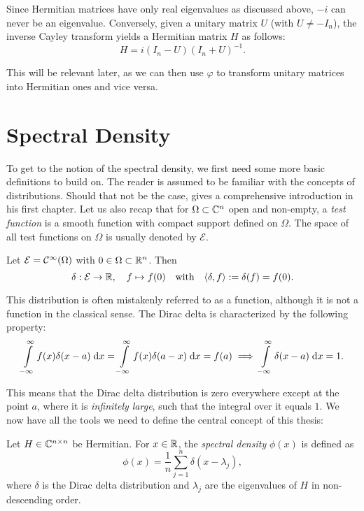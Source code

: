 Since Hermitian matrices have only real eigenvalues as discussed above, $-i$ can never be an eigenvalue. Conversely, given a unitary matrix $U$ (with $U \neq -I_n$), the inverse Cayley transform yields a Hermitian matrix $H$ as follows:
\[
H = i (I_n - U)(I_n + U)^{-1}.
\]

This will be relevant later, as we can then use $\varphi$ to transform unitary matrices into Hermitian ones and vice versa.

\section{Spectral Density}

To get to the notion of the spectral density, we first need some more basic definitions to build on.
The reader is assumed to be familiar with the concepts of distributions. Should that not be the case, \cite{strichartz} gives a comprehensive introduction in his first chapter. Let us also recap that for $\Omega \subset \mathbb{C}^n$ open and non-empty, a \emph{test function} is a smooth function with compact support defined on $\Omega$. The space of all test functions on $\Omega$ is usually denoted by $\mathcal{E}$.

\begin{definition}
    Let $\mathcal{E} = \mathcal{C}^{\infty}(\Omega)$ with $0 \in \Omega \subset \mathbb{R}^n$.
    Then
    \[
    \delta: \mathcal{E} \to \mathbb{R}, \quad f \mapsto f(0) \quad \text{with} \quad \langle \delta, f \rangle := \delta(f) = f(0).
    \]
\end{definition}

This distribution is often mistakenly referred to as a function, although it is not a function in the classical sense. The Dirac delta is characterized by the following property:
\[
\int\limits_{-\infty}^{\infty} f(x) \delta(x-a) \;\mathrm{d}x = \int\limits_{-\infty}^{\infty} f(x) \delta(a-x) \;\mathrm{d}x = f(a) \implies \int\limits_{-\infty}^{\infty} \delta(x-a) \;\mathrm{d}x = 1.
\]

This means that the Dirac delta distribution is zero everywhere except at the point $a$, where it is \emph{infinitely large}, such that the integral over it equals $1$. We now have all the tools we need to define the central concept of this thesis:

\begin{definition}
    Let $H \in \mathbb{C}^{n \times n}$ be Hermitian.
    For $x \in \mathbb{R}$, the \emph{spectral density} $\phi(x)$ is defined as
    \[
    \phi(x) = \frac{1}{n} \sum_{j=1}^{n} \delta(x - \lambda_j),
    \]
    where $\delta$ is the Dirac delta distribution
    and $\lambda_j$ are the eigenvalues of $H$ in non-descending order.
\end{definition}


